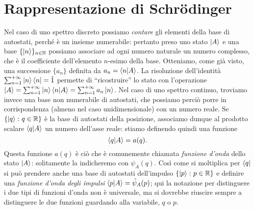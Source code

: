 \section{Rappresentazione di Schr\"odinger}
Nel caso di uno spettro discreto possiamo \emph{contare} gli elementi della base di autostati, perch\'e è un insieme numerabile: pertanto preso uno stato $\left|{A}\right\rangle$ e una base $\{\left|{n}\right\rangle\}_{n\in\mathbb{N}}$ possiamo associare ad ogni numero naturale un numero complesso, che è il coefficiente dell'elemento $n$-esimo della base.
Otteniamo, come già visto, una successione $\{a_n\}$ definita da $a_n=\left\langle{n}\middle|{A}\right\rangle$.
La risoluzione dell'identità $\sum_{{n}=1}^{+\infty}\left|{n}\right\rangle\left\langle{n}\right|=\hat{1}$ permette di ``ricostruire'' lo stato con l'operazione $\left|{A}\right\rangle=\sum_{{n}=1}^{+\infty}\left|{n}\right\rangle\left\langle{n}\middle|{A}\right\rangle=\sum_{{n}=1}^{+\infty}a_n\left|{n}\right\rangle$.
Nel caso di uno spettro continuo, troviamo invece una base non numerabile di autostati, che possiamo perciò porre in corrispondenza (almeno nel caso unidimensionale) con un numero reale.
Se $\{\left|{q}\right\rangle\colon q\in\mathbb{R}\}$ è la base di autostati della posizione, associamo dunque al prodotto scalare $\left\langle{q}\middle|{A}\right\rangle$ un numero dell'asse reale: stiamo definendo quindi una funzione
\begin{equation}
	\left\langle{q}\middle|{A}\right\rangle=a(q).
\end{equation}
Questa funzione $a(q)$ è ciò che è comunemente chiamata \emph{funzione d'onda} dello stato $\left|{A}\right\rangle$: solitamente la indicheremo con $\psi_A(q)$.
Cos\`i come si moltiplica per $\left\langle{q}\right|$ si può prendere anche una base di autostati dell'impulso $\{\left|{p}\right\rangle\colon p\in\mathbb{R}\}$ e definire una \emph{funzione d'onda degli impulsi}	$\left\langle{p}\middle|{A}\right\rangle=\tilde{\psi}_A(p)$; qui la notazione per distinguere i due tipi di funzioni d'onda non è universale, ma si dovrebbe riuscire sempre a distinguere le due funzioni guardando alla variabile, $q$ o $p$.

